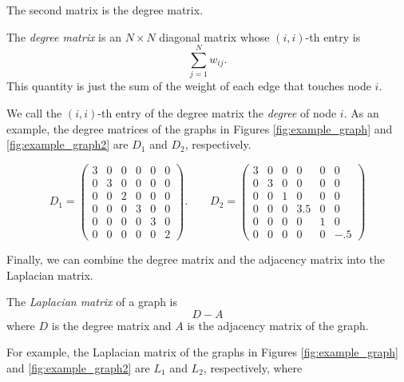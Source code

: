 The second matrix is the degree matrix. 
\begin{definition} The \emph{degree matrix} is an $N \times N$ diagonal matrix whose $(i,i)$-th entry is
\[ 
\sum_{j=1}^N w_{ij}.
\]
This quantity is just the sum of the weight of each edge that touches node $i$.
\end{definition}
We call the $(i, i)$-th entry of the degree matrix the \emph{degree} of node $i$. As an example, the degree matrices of the graphs in Figures \ref{fig:example_graph} and \ref{fig:example_graph2} are $D_1$ and $D_2$, respectively.

\[
D_1 = \begin{pmatrix}
3 & 0 & 0 & 0 & 0 & 0\\
0 & 3 & 0 & 0 & 0 & 0\\
0 & 0 & 2 & 0 & 0 & 0\\
0 & 0 & 0 & 3 & 0 & 0\\
0 & 0 & 0 & 0 & 3 & 0\\
0 & 0 & 0 & 0 & 0 & 2
\end{pmatrix}. \qquad D_2 = 
 \begin{pmatrix}
3 & 0 & 0 & 0 & 0 & 0\\
0 & 3 & 0 & 0 & 0 & 0\\
0 & 0 & 1 & 0 & 0 & 0\\
0 & 0 & 0 & 3.5 & 0 & 0\\
0 & 0 & 0 & 0 & 1 & 0\\
0 & 0 & 0 & 0 & 0 & -.5
\end{pmatrix}
\]

Finally, we can combine the degree matrix and the adjacency matrix into the Laplacian matrix.
\begin{definition}
The \emph{Laplacian matrix} of a graph is 
\[D - A \]
where $D$ is the degree matrix and $A$ is the adjacency matrix of the graph.
\end{definition}

For example, the Laplacian matrix of the graphs in Figures \ref{fig:example_graph} and \ref{fig:example_graph2} are $L_1$ and $L_2$, respectively, where

